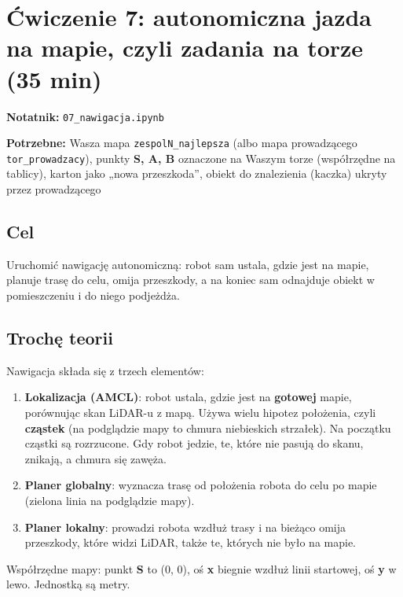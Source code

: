 \section{Ćwiczenie 7: autonomiczna jazda na mapie, czyli zadania na torze (35 min)}\label{ux107wiczenie-7-autonomiczna-jazda-na-mapie-czyli-zadania-na-torze-35-min}

\textbf{Notatnik:} \texttt{07\_nawigacja.ipynb}

\textbf{Potrzebne:} Wasza mapa \texttt{zespolN\_najlepsza} (albo mapa prowadzącego \texttt{tor\_prowadzacy}), punkty \textbf{S, A, B} oznaczone na Waszym torze (współrzędne na tablicy), karton jako „nowa przeszkoda'', obiekt do znalezienia (kaczka) ukryty przez prowadzącego

\subsection{Cel}\label{cel}

Uruchomić nawigację autonomiczną: robot sam ustala, gdzie jest na mapie, planuje trasę do celu, omija przeszkody, a na koniec sam odnajduje obiekt w pomieszczeniu i do niego podjeżdża.

\subsection{Trochę teorii}\label{trochux119-teorii}

Nawigacja składa się z trzech elementów:

\begin{enumerate}
\def\labelenumi{\arabic{enumi}.}
\tightlist
\item
  \textbf{Lokalizacja (AMCL)}: robot ustala, gdzie jest na \textbf{gotowej} mapie, porównując skan LiDAR-u z mapą. Używa wielu hipotez położenia, czyli \textbf{cząstek} (na podglądzie mapy to chmura niebieskich strzałek). Na początku cząstki są rozrzucone. Gdy robot jedzie, te, które nie pasują do skanu, znikają, a chmura się zawęża.
\item
  \textbf{Planer globalny}: wyznacza trasę od położenia robota do celu po mapie (zielona linia na podglądzie mapy).
\item
  \textbf{Planer lokalny}: prowadzi robota wzdłuż trasy i na bieżąco omija przeszkody, które widzi LiDAR, także te, których nie było na mapie.
\end{enumerate}

Współrzędne mapy: punkt \textbf{S} to (0, 0), oś \textbf{x} biegnie wzdłuż linii startowej, oś \textbf{y} w lewo. Jednostką są metry.

